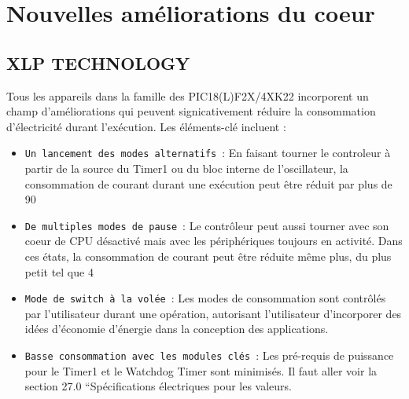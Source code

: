 \documentclass[a4paper, 12pt]{book}
\begin{document}
\section{Nouvelles améliorations du coeur}
\subsection{XLP TECHNOLOGY}
Tous les appareils dans la famille des PIC18(L)F2X/4XK22 incorporent un champ d’améliorations qui peuvent signicativement réduire la consommation d’électricité durant l’exécution. 
Les éléments-clé incluent :
\begin{itemize}
\item \texttt{Un lancement des modes alternatifs}~:
En faisant tourner le controleur à partir de la source du Timer1 ou du bloc interne de l’oscillateur, la consommation de courant durant une exécution peut être réduit par plus de 90%
\item \texttt{De multiples modes de pause}~:
Le contrôleur peut aussi tourner avec son coeur de CPU désactivé mais avec les périphériques toujours en activité. Dans ces états, la consommation de courant peut être réduite même plus, du plus petit tel que 4%
\item \texttt{Mode de switch à la volée}~:
Les modes de consommation sont contrôlés par l’utilisateur durant une opération, autorisant l’utilisateur d’incorporer des idées d’économie d’énergie dans la conception des applications.
\item \texttt{Basse consommation avec les modules clés}~:
Les pré-requis de puissance pour le Timer1 et le Watchdog Timer sont minimisés. Il faut aller voir la section 27.0 “Spécifications électriques pour les valeurs.\\
\end{itemize}
\end{document}
